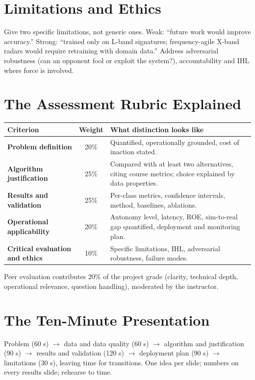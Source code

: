\documentclass[11pt]{article}
\begin{document}
\section{Limitations and Ethics}
Give two specific limitations, not generic ones. Weak: ``future work would improve accuracy.'' Strong: ``trained only on L-band signatures; frequency-agile X-band radars would require retraining with domain data.'' Address adversarial robustness (can an opponent fool or exploit the system?), accountability and IHL where force is involved.

\section{The Assessment Rubric Explained}
\begin{center}\small\renewcommand{\arraystretch}{1.25}
\begin{tabularx}{\textwidth}{>{\bfseries}p{3cm}cX}\toprule Criterion & Weight & What distinction looks like\\\midrule
Problem definition & 20\% & Quantified, operationally grounded, cost of inaction stated.\\
Algorithm justification & 25\% & Compared with at least two alternatives, citing course metrics; choice explained by data properties.\\
Results and validation & 25\% & Per-class metrics, confidence intervals, method, baselines, ablations.\\
Operational applicability & 20\% & Autonomy level, latency, ROE, sim-to-real gap quantified, deployment and monitoring plan.\\
Critical evaluation and ethics & 10\% & Specific limitations, IHL, adversarial robustness, failure modes.\\\bottomrule
\end{tabularx}\end{center}
Peer evaluation contributes 20\% of the project grade (clarity, technical depth, operational relevance, question handling), moderated by the instructor.

\section{The Ten-Minute Presentation}
Problem (60 s) $\to$ data and data quality (60 s) $\to$ algorithm and justification (90 s) $\to$ results and validation (120 s) $\to$ deployment plan (90 s) $\to$ limitations (30 s), leaving time for transitions. One idea per slide; numbers on every results slide; rehearse to time.
\end{document}

